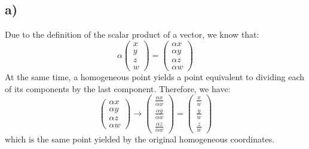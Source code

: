 \documentclass{article}
\begin{document}
\subsection*{a)}
    Due to the definition of the scalar product of a vector, we know that:
    $$\alpha\left(\begin{matrix} x\\y\\z\\w\end{matrix}\right) = \left(\begin{matrix} \alpha x\\ \alpha y\\ \alpha z\\ \alpha w\end{matrix}\right)$$
    At the same time, a homogeneous point yields a point equivalent to dividing each of its components by the last component. Therefore, we have:
    $$\left(\begin{matrix} \alpha x\\ \alpha y\\ \alpha z\\ \alpha w\end{matrix}\right) \rightarrow \left(\begin{matrix} \frac{\alpha x}{\alpha w}\\ \frac{\alpha y}{\alpha w}\\ \frac{\alpha z}{\alpha w}\end{matrix}\right) = \left(\begin{matrix} \frac{x}{w}\\ \frac{y}{w}\\ \frac{z}{w}\end{matrix}\right)$$
    which is the same point yielded by the original homogeneous coordinates.
\end{document}
